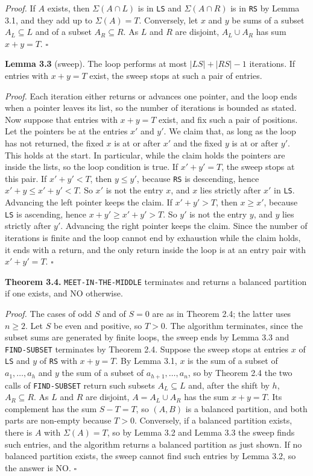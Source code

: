\documentclass[
]{article}
\begin{document}
\emph{Proof.} If \(A\) exists, then \(\Sigma(A \cap L)\) is in
\texttt{LS} and \(\Sigma(A \cap R)\) is in \texttt{RS} by Lemma 3.1, and
they add up to \(\Sigma(A) = T\). Conversely, let \(x\) and \(y\) be
sums of a subset \(A_L \subseteq L\) and of a subset
\(A_R \subseteq R\). As \(L\) and \(R\) are disjoint, \(A_L \cup A_R\)
has sum \(x + y = T\). \(\square\)

\textbf{Lemma 3.3} (sweep). The loop performs at most
\(|LS| + |RS| - 1\) iterations. If entries with \(x + y = T\) exist, the
sweep stops at such a pair of entries.

\emph{Proof.} Each iteration either returns or advances one pointer, and
the loop ends when a pointer leaves its list, so the number of
iterations is bounded as stated. Now suppose that entries with
\(x + y = T\) exist, and fix such a pair of positions. Let the pointers
be at the entries \(x'\) and \(y'\). We claim that, as long as the loop
has not returned, the fixed \(x\) is at or after \(x'\) and the fixed
\(y\) is at or after \(y'\). This holds at the start. In particular,
while the claim holds the pointers are inside the lists, so the loop
condition is true. If \(x' + y' = T\), the sweep stops at this pair. If
\(x' + y' < T\), then \(y \le y'\), because \texttt{RS} is descending,
hence \(x' + y \le x' + y' < T\). So \(x'\) is not the entry \(x\), and
\(x\) lies strictly after \(x'\) in \texttt{LS}. Advancing the left
pointer keeps the claim. If \(x' + y' > T\), then \(x \ge x'\), because
\texttt{LS} is ascending, hence \(x + y' \ge x' + y' > T\). So \(y'\) is
not the entry \(y\), and \(y\) lies strictly after \(y'\). Advancing the
right pointer keeps the claim. Since the number of iterations is finite
and the loop cannot end by exhaustion while the claim holds, it ends
with a return, and the only return inside the loop is at an entry pair
with \(x' + y' = T\). \(\square\)

\textbf{Theorem 3.4.} \texttt{MEET-IN-THE-MIDDLE} terminates and returns
a balanced partition if one exists, and NO otherwise.

\emph{Proof.} The cases of odd \(S\) and of \(S = 0\) are as in Theorem
2.4; the latter uses \(n \ge 2\). Let \(S\) be even and positive, so
\(T > 0\). The algorithm terminates, since the subset sums are generated
by finite loops, the sweep ends by Lemma 3.3 and \texttt{FIND-SUBSET}
terminates by Theorem 2.4. Suppose the sweep stops at entries \(x\) of
\texttt{LS} and \(y\) of \texttt{RS} with \(x + y = T\). By Lemma 3.1,
\(x\) is the sum of a subset of \(a_1, \dots, a_h\) and \(y\) the sum of
a subset of \(a_{h+1}, \dots, a_n\), so by Theorem 2.4 the two calls of
\texttt{FIND-SUBSET} return such subsets \(A_L \subseteq L\) and, after
the shift by \(h\), \(A_R \subseteq R\). As \(L\) and \(R\) are
disjoint, \(A = A_L \cup A_R\) has the sum \(x + y = T\). Its complement
has the sum \(S - T = T\), so \((A, B)\) is a balanced partition, and
both parts are non-empty because \(T > 0\). Conversely, if a balanced
partition exists, there is \(A\) with \(\Sigma(A) = T\), so by Lemma 3.2
and Lemma 3.3 the sweep finds such entries, and the algorithm returns a
balanced partition as just shown. If no balanced partition exists, the
sweep cannot find such entries by Lemma 3.2, so the answer is NO.
\(\square\)
\end{document}
